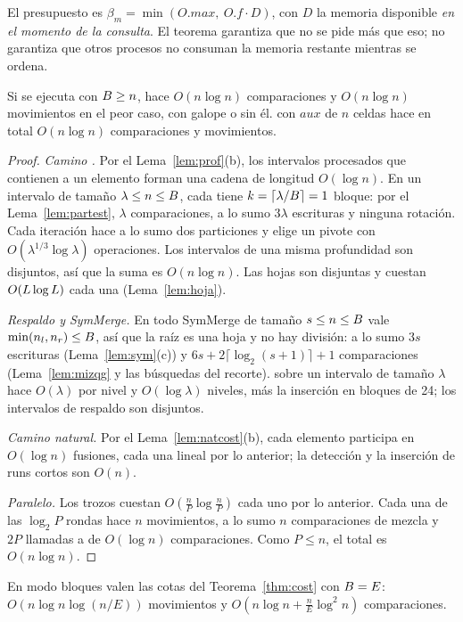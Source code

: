 \noindent El presupuesto es $\beta_m=\min(O.\mathit{max},\ O.f\cdot D)$, con $D$ la
memoria disponible \emph{en el momento de la consulta}. El teorema garantiza que no se
pide más que eso; no garantiza que otros procesos no consuman la memoria restante
mientras se ordena.

\begin{teorema}\label{thm:rapcost}
Si \SotSort se ejecuta con $B\ge n$, hace $O(n\log n)$ comparaciones y $O(n\log n)$
movimientos en el peor caso, con galope o sin él. \Paralelo con $\mathit{aux}$ de $n$
celdas hace en total $O(n\log n)$ comparaciones y movimientos.
\end{teorema}
\begin{proof}
\emph{Camino \Quick.} Por el Lema~\ref{lem:prof}(b), los intervalos procesados que
contienen a un elemento forman una cadena de longitud $O(\log n)$. En un intervalo de
tamaño $\lambda\le n\le B$, cada \Part tiene $k=\lceil\lambda/B\rceil=1$ bloque: por
el Lema~\ref{lem:partest}, $\lambda$ comparaciones, a lo sumo $3\lambda$ escrituras y
ninguna rotación. Cada iteración hace a lo sumo dos particiones y elige un pivote con
$O(\lambda^{1/3}\log\lambda)$ operaciones. Los intervalos de una misma profundidad son
disjuntos, así que la suma es $O(n\log n)$. Las hojas son disjuntas y cuestan
$O(L\log L)$ cada una (Lema~\ref{lem:hoja}).

\emph{Respaldo y SymMerge.} En todo SymMerge de tamaño $s\le n\le B$ vale
$\min(n_l,n_r)\le B$, así que la raíz es una hoja y no hay división: a lo sumo $3s$
escrituras (Lema~\ref{lem:sym}(c)) y $6s+2\lceil\log_2(s{+}1)\rceil+1$ comparaciones
(Lema~\ref{lem:mizqg} y las búsquedas del recorte). \Respaldo sobre un intervalo de
tamaño $\lambda$ hace $O(\lambda)$ por nivel y $O(\log\lambda)$ niveles, más la inserción
en bloques de 24; los intervalos de respaldo son disjuntos.

\emph{Camino natural.} Por el Lema~\ref{lem:natcost}(b), cada elemento participa en
$O(\log n)$ fusiones, cada una lineal por lo anterior; la detección y la inserción de
runs cortos son $O(n)$.

\emph{Paralelo.} Los trozos cuestan $O(\frac{n}{P}\log\frac{n}{P})$ cada uno por lo
anterior. Cada una de las $\log_2P$ rondas hace $n$ movimientos, a lo sumo $n$
comparaciones de mezcla y $2P$ llamadas a \CoRango de $O(\log n)$ comparaciones. Como
$P\le n$, el total es $O(n\log n)$.
\end{proof}

\noindent En modo bloques valen las cotas del Teorema~\ref{thm:cost} con $B=E$:
$O(n\log n\log(n/E))$ movimientos y $O(n\log n+\frac{n}{E}\log^2n)$ comparaciones.

